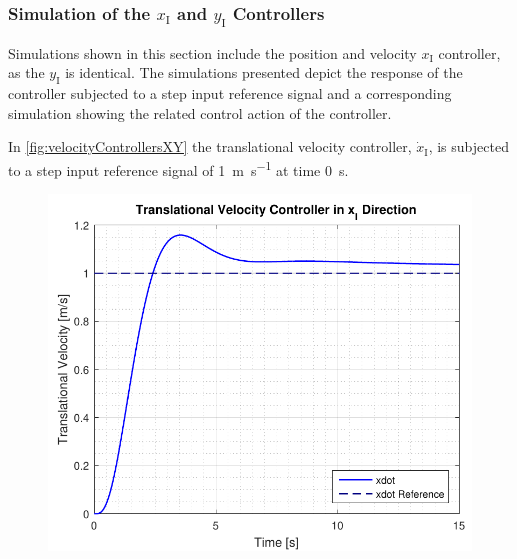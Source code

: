 \subsubsection{Simulation of the $x_{\mathrm{I}}$ and $y_{\mathrm{I}}$ Controllers}
Simulations shown in this section include the position and velocity $x_{\mathrm{I}}$ controller, as the $y_{\mathrm{I}}$ is identical. The simulations presented depict the response of the controller subjected to a step input reference signal and a corresponding simulation showing the related control action of the controller. 

In \autoref{fig:velocityControllersXY} the translational velocity controller, $\dot{x}_{\mathrm{I}}$, is subjected to a step input reference signal of \SI{1}{m s^{-1}} at time \SI{0}{s}. 

\begin{minipage}{\linewidth}
    \begin{minipage}{0.46\linewidth}
        \begin{figure}[H]
            \includegraphics[scale=.5]{figures/velocityControllersXY}
            \centering			
            \label{fig:velocityControllersXY}
        \end{figure}
    \end{minipage}
    \hspace{0.03\linewidth}

\end{minipage}
